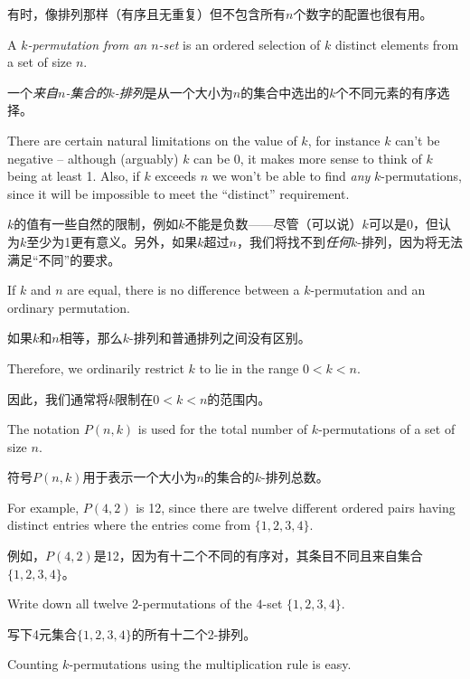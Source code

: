 有时，像排列那样（有序且无重复）但不包含所有$n$个数字的配置也很有用。

\begin{defi}
A \emph{$k$-permutation from an $n$-set} is an ordered selection
of $k$ distinct elements from a set of size $n$.
\end{defi}

\begin{defi}
一个\emph{来自$n$-集合的$k$-排列}是从一个大小为$n$的集合中选出的$k$个不同元素的有序选择。
\end{defi}

There are certain natural limitations on the value of $k$, for instance $k$
can't be negative -- although (arguably) $k$ can be 0, it makes more sense
to think of $k$ being at least 1.  Also, if $k$ exceeds
$n$ we won't be able to find \emph{any} $k$-permutations, 
since it will be impossible
to meet the ``distinct'' requirement.

$k$的值有一些自然的限制，例如$k$不能是负数——尽管（可以说）$k$可以是0，但认为$k$至少为1更有意义。另外，如果$k$超过$n$，我们将找不到\emph{任何}$k$-排列，因为将无法满足“不同”的要求。

If $k$ and $n$ are equal, there is 
no difference between a $k$-permutation and an ordinary permutation.

如果$k$和$n$相等，那么$k$-排列和普通排列之间没有区别。

Therefore, we ordinarily restrict $k$ to lie in the range $0 < k < n$.

因此，我们通常将$k$限制在$0 < k < n$的范围内。

The notation $P(n,k)$ is used for the total number of $k$-permutations
of a set of size $n$.

符号$P(n,k)$用于表示一个大小为$n$的集合的$k$-排列总数。

For example, $P(4,2)$ is 12, since there are
twelve different ordered pairs having distinct entries where the 
entries come from $\{1,2,3,4\}$.

例如，$P(4,2)$是12，因为有十二个不同的有序对，其条目不同且来自集合$\{1,2,3,4\}$。

\begin{exer}
Write down all twelve $2$-permutations of the $4$-set $\{1,2,3,4\}$.
\end{exer}

\begin{exer}
写下4元集合$\{1,2,3,4\}$的所有十二个2-排列。
\end{exer}

Counting $k$-permutations using the multiplication rule is easy.

